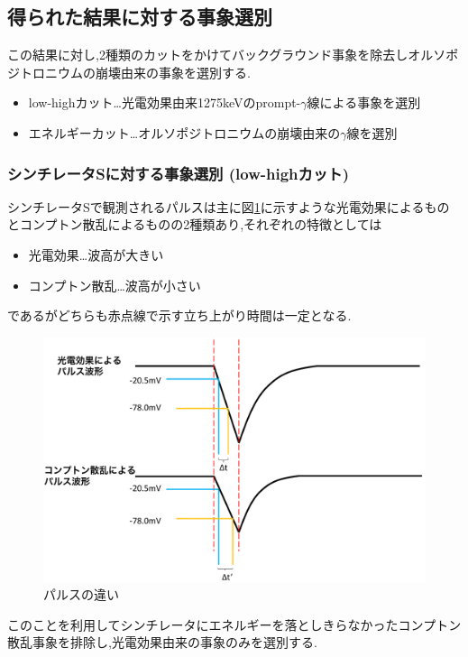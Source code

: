\subsection{得られた結果に対する事象選別}
この結果に対し,2種類のカットをかけてバックグラウンド事象を除去しオルソポジトロニウムの崩壊由来の事象を選別する.
\begin{itemize}
	\item low-highカット…光電効果由来1275keVのprompt-$\gamma$線による事象を選別
	\item エネルギーカット…オルソポジトロニウムの崩壊由来の$\gamma$線を選別
\end{itemize}

\subsubsection{シンチレータSに対する事象選別 (low-highカット)}
シンチレータSで観測されるパルスは主に図\ref{fig:pulse_diff}に示すような光電効果によるものとコンプトン散乱によるものの2種類あり,それぞれの特徴としては
\begin{itemize}
	\item 光電効果…波高が大きい
	\item コンプトン散乱…波高が小さい
\end{itemize}
であるがどちらも赤点線で示す立ち上がり時間は一定となる.
\begin{figure}[H]
	\centering
		\includegraphics[width=15cm]{fig/isb/pulse_difference.pdf}
		\caption{パルスの違い}
		\label{fig:pulse_diff}
\end{figure}
このことを利用してシンチレータにエネルギーを落としきらなかったコンプトン散乱事象を排除し,光電効果由来の事象のみを選別する.

